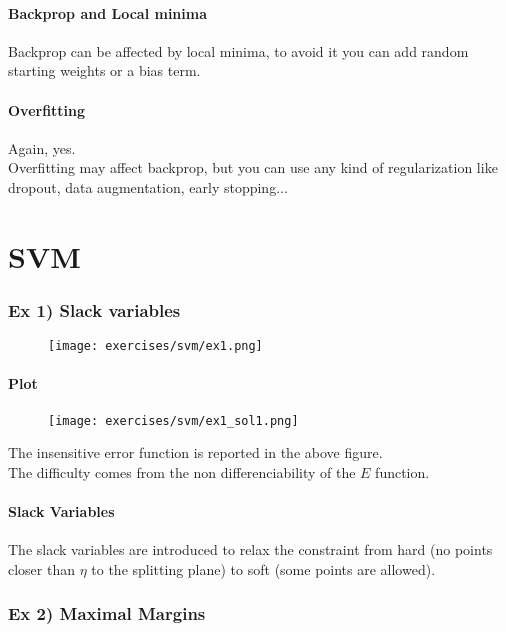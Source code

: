 \paragraph{Backprop and Local minima}
Backprop can be affected by local minima, to avoid it  you can add random starting weights or a bias term.

\paragraph{Overfitting}
Again, yes. \\
Overfitting may affect backprop, but you can use any kind of regularization like dropout, data augmentation, early stopping...

\section{SVM}


\subsubsection{Ex 1) Slack variables}

\begin{figure}[H]
    \centering
    \texttt{[image: exercises/svm/ex1.png]}
\end{figure}

\paragraph{Plot}
\begin{figure}[H]
    \centering
    \texttt{[image: exercises/svm/ex1\_sol1.png]}
\end{figure}
The insensitive error function is reported in the above figure.\\
The difficulty comes from the non differenciability of the $E$ function.

\paragraph{Slack Variables}
The slack variables are introduced to relax the constraint from hard (no points closer than $\eta$ to the splitting plane) to soft (some points are allowed).


\subsubsection{Ex 2) Maximal Margins}

